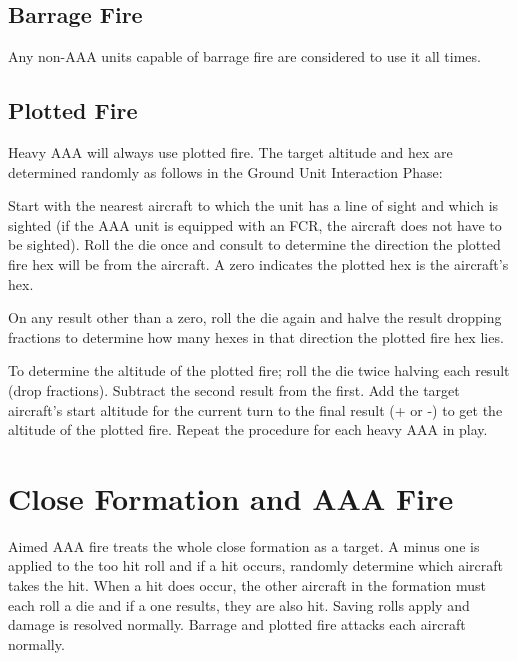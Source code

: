\begin{advancedrules}
    \subsection{Barrage Fire} Any non-AAA units capable of barrage fire are considered to use it all times.

    \subsection{Plotted Fire} Heavy AAA will always use plotted fire. The target altitude and hex are determined randomly as follows in the Ground Unit Interaction Phase:

    Start with the nearest aircraft to which the unit has a line of sight and which is sighted (if the AAA unit is equipped with an FCR, the aircraft does not have to be sighted). Roll the die once and consult  to determine the direction the plotted fire hex will be from the aircraft. A zero indicates the plotted hex is the aircraft's hex.

    On any result other than a zero, roll the die again and halve the result dropping fractions to determine how many hexes in that direction the plotted fire hex lies.

    To determine the altitude of the plotted fire; roll the die twice halving each result (drop fractions). Subtract the second result from the first. Add the target aircraft's start altitude for the current turn to the final result (+ or -) to get the altitude of the plotted fire. Repeat the procedure for each heavy AAA in play.

    \section{Close Formation and AAA Fire}

    Aimed AAA fire treats the whole close formation as a target. A minus one is applied to the too hit roll and if a hit occurs, randomly determine which aircraft takes the hit. When a hit does occur, the other aircraft in the formation must each roll a die and if a one results, they are also hit. Saving rolls apply and damage is resolved normally. Barrage and plotted fire attacks each aircraft normally.

\end{advancedrules}

